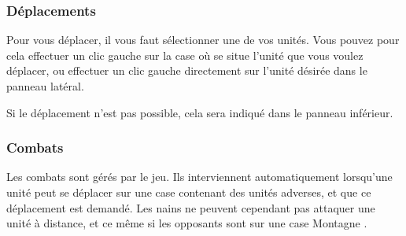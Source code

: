 \documentclass[a4paper]{article}
\begin{document}
		\subsubsection{Déplacements}
		Pour vous déplacer, il vous faut sélectionner une de vos unités. Vous pouvez pour cela effectuer un clic gauche sur la case où se situe l'unité que vous voulez déplacer, ou effectuer un clic gauche directement sur l'unité désirée dans le panneau latéral.

		Si le déplacement n'est pas possible, cela sera indiqué dans le panneau inférieur.

		\subsubsection{Combats}
		Les combats sont gérés par le jeu. Ils interviennent automatiquement lorsqu'une unité peut se déplacer sur une case contenant des unités adverses, et que ce déplacement est demandé. Les nains ne peuvent cependant pas attaquer une unité à distance, et ce même si les opposants sont sur une case \og Montagne \fg{}.
\end{document}
